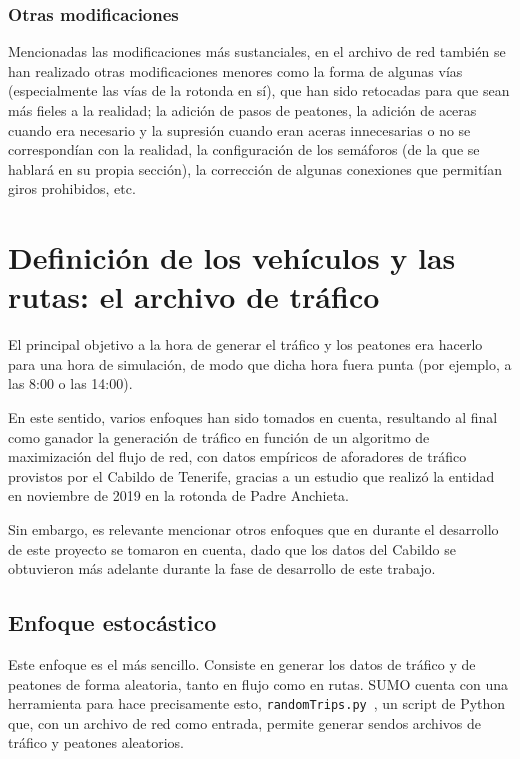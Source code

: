 \subsubsection{Otras modificaciones}

Mencionadas las modificaciones más sustanciales, en el archivo de red también se han realizado otras modificaciones menores como la forma de algunas vías (especialmente las vías de la rotonda en sí), que han sido retocadas para que sean más fieles a la realidad; la adición de pasos de peatones, la adición de aceras cuando era necesario y la supresión cuando eran aceras innecesarias o no se correspondían con la realidad, la configuración de los semáforos (de la que se hablará en su propia sección), la corrección de algunas conexiones que permitían giros prohibidos, etc.

\section{Definición de los vehículos y las rutas: el archivo de tráfico}

El principal objetivo a la hora de generar el tráfico y los peatones era hacerlo para una hora de simulación, de modo que dicha hora fuera punta (por ejemplo, a las 8:00 o las 14:00).

En este sentido, varios enfoques han sido tomados en cuenta, resultando al final como ganador la generación de tráfico en función de un algoritmo de maximización del flujo de red, con datos empíricos de aforadores de tráfico provistos por el Cabildo de Tenerife, gracias a un estudio que realizó la entidad en noviembre de 2019 en la rotonda de Padre Anchieta. 

Sin embargo, es relevante mencionar otros enfoques que en durante el desarrollo de este proyecto se tomaron en cuenta, dado que los datos del Cabildo se obtuvieron más adelante durante la fase de desarrollo de este trabajo.

\subsection{Enfoque estocástico}
\label{enfoque_estocastico}

Este enfoque es el más sencillo. Consiste en generar los datos de tráfico y de peatones de forma aleatoria, tanto en flujo como en rutas. SUMO cuenta con una herramienta para hace precisamente esto, \texttt{randomTrips.py}~\cite{noauthor_randomtripspy_nodate}, un script de Python que, con un archivo de red como entrada, permite generar sendos archivos de tráfico y peatones aleatorios.

